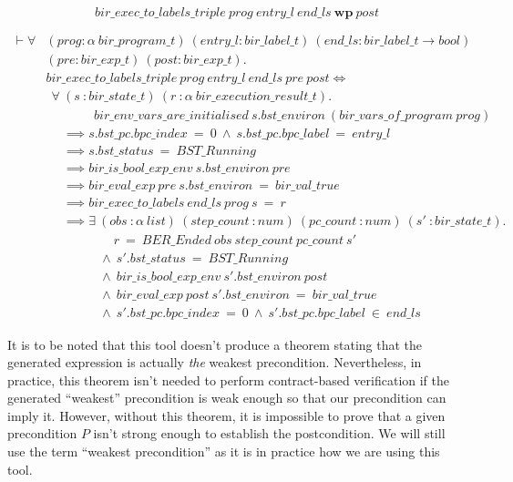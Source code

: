 \documentclass{kththesis}
\begin{document}
{\begin{equation}
    bir\_exec\_to\_labels\_triple~prog~entry\_l~end\_ls~\mathbf{wp}~post
    \label{triple_wp_thm}
\end{equation}

\begin{small}
\begin{equation}
\begin{split}
    \vdash \forall &(prog :\alpha~bir\_program\_t)~(entry\_l :bir\_label\_t)%
    ~(end\_ls :bir\_label\_t \rightarrow bool)\\
    & (pre :bir\_exp\_t)~(post :bir\_exp\_t).\\
    & bir\_exec\_to\_labels\_triple~prog~entry\_l~end\_ls~pre~post \Leftrightarrow\\
    & ~~\forall~(s~:bir\_state\_t)~(r~:\alpha~bir\_execution\_result\_t).\\
    & ~~~~~~~~~~~~~~~~~bir\_env\_vars\_are\_initialised~s.bst\_environ~(bir\_vars\_of\_program~prog)\\
    & ~~~~~~\implies s.bst\_pc.bpc\_index~=~0~\land~s.bst\_pc.bpc\_label~=~entry\_l\\
    & ~~~~~~\implies s.bst\_status~=~BST\_Running\\
    & ~~~~~~\implies bir\_is\_bool\_exp\_env~s.bst\_environ~pre\\
    & ~~~~~~\implies bir\_eval\_exp~pre~s.bst\_environ~=~bir\_val\_true\\
    & ~~~~~~\implies bir\_exec\_to\_labels~end\_ls~prog~s~=~r\\
    & ~~~~~~\implies \exists~(obs~:\alpha~list)~(step\_count~:num)%
    ~(pc\_count~:num)~(s'~:bir\_state\_t).\\
    & ~~~~~~~~~~~~~~~~~~~~~~~~r~=~BER\_Ended~obs~step\_count~pc\_count~s'\\
    & ~~~~~~~~~~~~~~~~~~~\land~s'.bst\_status~=~BST\_Running\\
    & ~~~~~~~~~~~~~~~~~~~\land~bir\_is\_bool\_exp\_env~s'.bst\_environ~post\\
    & ~~~~~~~~~~~~~~~~~~~\land~bir\_eval\_exp~post~s'.bst\_environ~=~bir\_val\_true\\
    & ~~~~~~~~~~~~~~~~~~~\land~s'.bst\_pc.bpc\_index~=~0~\land~s'.bst\_pc.bpc\_label~\in~end\_ls
\end{split}
\label{holba_wp_ht_thm}
\end{equation}
\end{small}

It is to be noted that this tool doesn't produce a theorem stating that the generated expression is actually \textit{the} weakest precondition. Nevertheless, in practice, this theorem isn't needed to perform contract-based verification if the generated ``weakest'' precondition is weak enough so that our precondition can imply it. However, without this theorem, it is impossible to prove that a given precondition $P$ isn't strong enough to establish the postcondition. We will still use the term ``weakest precondition'' as it is in practice how we are using this tool.

}
\end{document}
